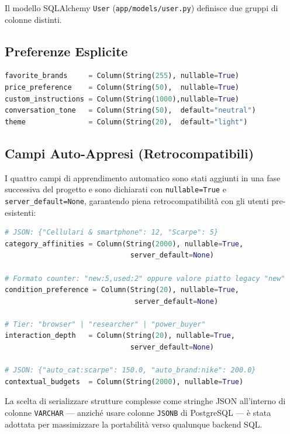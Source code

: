 Il modello SQLAlchemy \texttt{User} (\texttt{app/models/user.py})
definisce due gruppi di colonne distinti.

\subsection{Preferenze Esplicite}
\label{subsec:explicit-prefs}

\begin{lstlisting}[language=Python,caption={Colonne di preferenza esplicita nel modello User (app/models/user.py)},label=lst:user-model-explicit]
favorite_brands     = Column(String(255), nullable=True)
price_preference    = Column(String(50),  nullable=True)
custom_instructions = Column(String(1000),nullable=True)
conversation_tone   = Column(String(50),  default="neutral")
theme               = Column(String(20),  default="light")
\end{lstlisting}

\subsection{Campi Auto-Appresi (Retrocompatibili)}
\label{subsec:auto-learned-cols}

I quattro campi di apprendimento automatico sono stati aggiunti in una
fase successiva del progetto e sono dichiarati con \texttt{nullable=True}
e \texttt{server\_default=None}, garantendo piena retrocompatibilità con
gli utenti pre-esistenti:

\begin{lstlisting}[language=Python,caption={Colonne auto-apprese nel modello User (app/models/user.py)},label=lst:user-model-auto]
# JSON: {"Cellulari & smartphone": 12, "Scarpe": 5}
category_affinities = Column(String(2000), nullable=True,
                              server_default=None)

# Formato counter: "new:5,used:2" oppure valore piatto legacy "new"
condition_preference = Column(String(20), nullable=True,
                               server_default=None)

# Tier: "browser" | "researcher" | "power_buyer"
interaction_depth   = Column(String(20), nullable=True,
                              server_default=None)

# JSON: {"auto_cat:scarpe": 150.0, "auto_brand:nike": 200.0}
contextual_budgets  = Column(String(2000), nullable=True)
\end{lstlisting}

La scelta di serializzare strutture complesse come stringhe JSON all'interno
di colonne \texttt{VARCHAR} — anziché usare colonne \texttt{JSONB} di
PostgreSQL — è stata adottata per massimizzare la portabilità verso
qualunque backend SQL.


